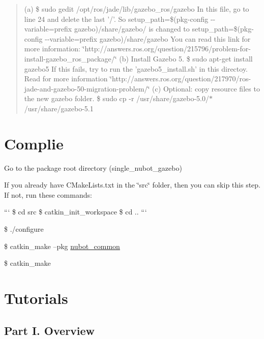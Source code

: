 \begin{quotation}
(a) {\ttfamily \$ sudo gedit /opt/ros/jade/lib/gazebo\-\_\-ros/gazebo} In this file, go to line 24 and delete the last '/'. So {\ttfamily setup\-\_\-path=\$(pkg-\/config -\/-\/variable=prefix gazebo)/share/gazebo/} is changed to {\ttfamily setup\-\_\-path=\$(pkg-\/config -\/-\/variable=prefix gazebo)/share/gazebo} You can read this link for more information\-: \char`\"{}http\-://answers.\-ros.\-org/question/215796/problem-\/for-\/install-\/gazebo\-\_\-ros\-\_\-package/\char`\"{} (b) Install Gazebo 5. {\ttfamily \$ sudo apt-\/get install gazebo5} If this fails, try to run the 'gazebo5\-\_\-install.\-sh' in this directoy. Read for more information \char`\"{}http\-://answers.\-ros.\-org/question/217970/ros-\/jade-\/and-\/gazebo-\/50-\/migration-\/problem/\char`\"{} (c) Optional\-: copy resource files to the new gazebo folder. {\ttfamily \$ sudo cp -\/r /usr/share/gazebo-\/5.0/$\ast$ /usr/share/gazebo-\/5.1}

\end{quotation}


\section*{Complie}


\begin{DoxyEnumerate}
\item Go to the package root directory (single\-\_\-nubot\-\_\-gazebo)
\item If you already have C\-Make\-Lists.\-txt in the \char`\"{}src\char`\"{} folder, then you can skip this step. If not, run these commands\-:

``` \$ cd src \$ catkin\-\_\-init\-\_\-workspace \$ cd .. ```
\item \$ ./configure
\item \$ catkin\-\_\-make --pkg \hyperlink{namespacenubot__common}{nubot\-\_\-common}
\item \$ catkin\-\_\-make
\end{DoxyEnumerate}

\section*{Tutorials}

\subsection*{Part I. Overview}

